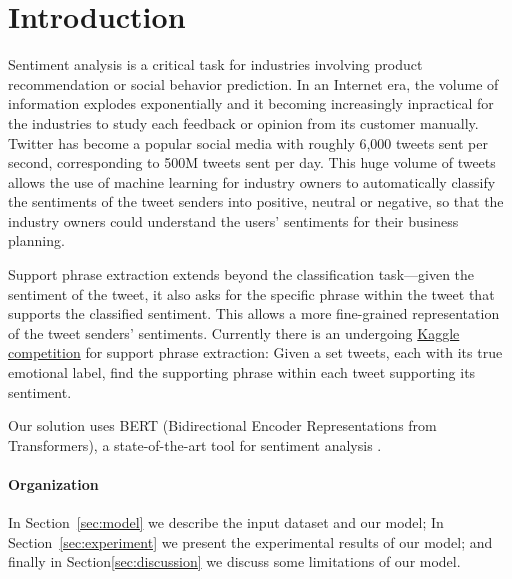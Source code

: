 \section{Introduction} \label{sec:introduction}

Sentiment analysis is a critical task for industries involving product recommendation or social behavior prediction. In an Internet era, the volume of information explodes exponentially and it becoming increasingly inpractical for the industries to study each feedback or opinion from its customer manually. Twitter has become a popular social media with roughly 6,000 tweets sent per second, corresponding to 500M tweets sent per day. This huge volume of tweets allows the use of machine learning for industry owners to automatically classify the sentiments of the tweet senders into positive, neutral or negative, so that the industry owners could understand the users' sentiments for their business planning. 

Support phrase extraction extends beyond the classification task---given the sentiment of the tweet, it also asks for the specific phrase within the tweet that supports the classified sentiment. This allows a more fine-grained representation of the tweet senders' sentiments. Currently there is an undergoing \href{https://www.kaggle.com/c/tweet-sentiment-extraction}{Kaggle competition} for support phrase extraction: Given a set tweets, each with its true emotional label, find the supporting phrase within each tweet supporting its sentiment. 


Our solution uses BERT (Bidirectional Encoder Representations from Transformers), a state-of-the-art tool for sentiment analysis \cite{devlin2018bert}. 


\paragraph{Organization} In Section~\ref{sec:model} we describe the input dataset and our model; In Section~\ref{sec:experiment} we present the experimental results of our model; and finally in Section\ref{sec:discussion} we discuss some limitations of our model.
